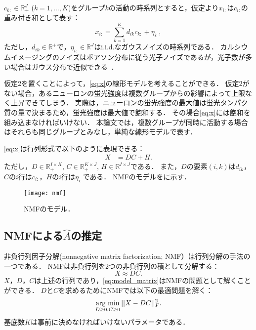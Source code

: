 $c_{k:} \in \mathbb{R}^J_+$ ($k=1,\dots,K$)をグループ$k$の活動の時系列とすると，仮定より$x_{i:}$は$c_{i:}$の重み付き和として表す：
\begin{equation}
	x_{i:} = \sum_{k=1}^K d_{ik} c_{k:} + \eta_{i:},
  \label{eq:x}
\end{equation}
ただし，$d_{ik} \in \mathbb{R}^+$で，$\eta_{i:} \in \mathbb{R}^J$はi.i.d.なガウスノイズの時系列である．
カルシウムイメージングのノイズはポアソン分布に従う光子ノイズであるが，光子数が多い場合はガウス分布で近似できる~\cite{Sjulson2007}．

仮定2を置くことによって，\eqref{eq:x}の線形モデルを考えることができる．
仮定2がない場合，あるニューロンの蛍光強度は複数グループからの影響によって上限なく上昇できてしまう．
実際は，ニューロンの蛍光強度の最大値は蛍光タンパク質の量で決まるため，蛍光強度は最大値で飽和する．
その場合\eqref{eq:x}には飽和を組み込まなければいけない．
本論文では，複数グループが同時に活動する場合はそれらも同じグループとみなし，単純な線形モデルで表す．

\eqref{eq:x}は行列形式で以下のように表現できる：
\begin{align}
  X &= DC + H. \label{eq:model_matrix}
\end{align}
ただし，$D \in \mathbb{R}_+^{I \times K}$, $C \in \mathbb{R}_+^{K \times J}$, $H \in \mathbb{R}^{I \times J}$である．
また，$D$の要素$(i,k)$は$d_{ik}$，$C$の$i$行は$c_{i:}$，$H$の$i$行は$\eta_{i:}$である．
NMFのモデルをに示す．

\begin{figure}[htbp]
	\centering
	\texttt{[image: nmf]}
	\caption{NMFのモデル．}
	\label{fig:nmf}
\end{figure}

\subsection{NMFによる$\hat{A}$の推定}
非負行列因子分解(nonnegative matrix factorization; NMF）\cite{Lee1999}は行列分解の手法の一つである．
NMFは非負行列を2つの非負行列の積として分解する：
\begin{equation}
	X \approx DC.
\end{equation}
$X$，$D$，$C$は上述の行列であり，\eqref{eq:model_matrix}はNMFの問題として解くことができる．
$D$と$C$を求めるためにNMFでは以下の最適問題を解く：
\begin{equation}
	\mathop{\textrm{arg~min}}\limits_{D \geq 0, C \geq 0} ||X - DC||_F^2.
\end{equation}
基底数$K$は事前に決めなければいけないパラメータである．

